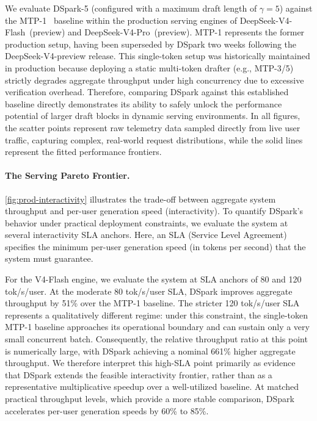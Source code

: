 We evaluate DSpark-5 (configured with a maximum draft length of $\gamma=5$) against the MTP-1~\citep{liu2024deepseek} baseline within the production serving engines of DeepSeek-V4-Flash~(preview) and DeepSeek-V4-Pro~(preview).
MTP-1 represents the former production setup, having been superseded by DSpark two weeks following the DeepSeek-V4-preview release.
This single-token setup was historically maintained in production because deploying a static multi-token drafter (e.g., MTP-3/5) strictly degrades aggregate throughput under high concurrency due to excessive verification overhead. 
Therefore, comparing DSpark against this established baseline directly demonstrates its ability to safely unlock the performance potential of larger draft blocks in dynamic serving environments. 
In all figures, the scatter points represent raw telemetry data sampled directly from live user traffic, capturing complex, real-world request distributions, while the solid lines represent the fitted performance frontiers.

\paragraph{The Serving Pareto Frontier.}
\autoref{fig:prod-interactivity} illustrates the trade-off between aggregate system throughput and per-user generation speed (interactivity).
To quantify DSpark's behavior under practical deployment constraints, we evaluate the system at several interactivity SLA anchors. Here, an SLA (Service Level Agreement) specifies the minimum per-user generation speed (in tokens per second) that the system must guarantee.

For the V4-Flash engine, we evaluate the system at SLA anchors of 80 and 120 tok/s/user. 
At the moderate 80 tok/s/user SLA, DSpark improves aggregate throughput by 51\% over the MTP-1 baseline.
The stricter 120 tok/s/user SLA represents a qualitatively different regime: under this constraint, the single-token MTP-1 baseline approaches its operational boundary and can sustain only a very small concurrent batch.
Consequently, the relative throughput ratio at this point is numerically large, with DSpark achieving a nominal 661\% higher aggregate throughput.
We therefore interpret this high-SLA point primarily as evidence that DSpark extends the feasible interactivity frontier, rather than as a representative multiplicative speedup over a well-utilized baseline.
At matched practical throughput levels, which provide a more stable comparison, DSpark accelerates per-user generation speeds by 60\% to 85\%.

